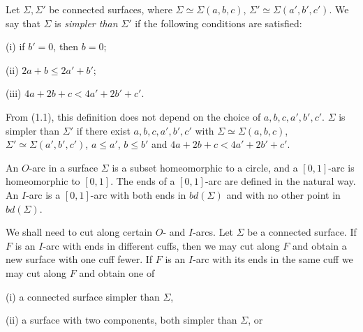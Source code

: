 Let $\Sigma, \Sigma'$ be connected surfaces, where $\Sigma \simeq \Sigma(a, b, c)$, $\Sigma' \simeq \Sigma(a', b', c')$. We say that $\Sigma$ is \textit{simpler than} $\Sigma'$ if the following conditions are satisfied:

\hspace*{12pt}(i) if $b' = 0$, then $b = 0$;

\hspace*{12pt}(ii) $2a + b \le 2a' + b'$;

\hspace*{12pt}(iii) $4a + 2b + c < 4a' + 2b' + c'$.

From (1.1), this definition does not depend on the choice of $a, b, c, a', b', c'$.   $\Sigma$ is simpler than $\Sigma'$ if there exist $a, b, c, a', b', c'$ with $\Sigma \simeq \Sigma(a, b, c)$, $\Sigma' \simeq \Sigma(a', b', c')$, $a \le a'$, $b \le b'$ and $4a + 2b + c < 4a' + 2b' + c'$.

An $O$-arc in a surface $\Sigma$ is a subset homeomorphic to a circle, and a $[0, 1]$-arc is homeomorphic to $[0, 1]$. The ends of a $[0, 1]$-arc are defined in the natural way. An $I$-arc is a $[0, 1]$-arc with both ends in $bd(\Sigma)$ and with no other point in $bd(\Sigma)$.

We shall need to cut along certain $O$- and $I$-arcs. Let $\Sigma$ be a connected surface. If $F$ is an $I$-arc with ends in different cuffs, then we may cut along $F$ and obtain a new surface with one cuff fewer. If $F$ is an $I$-arc with its ends in the same cuff we may cut along $F$ and obtain one of

\hspace*{12pt}(i) a connected surface simpler than $\Sigma$,

\hspace*{12pt}(ii) a surface with two components, both simpler than $\Sigma$, or

